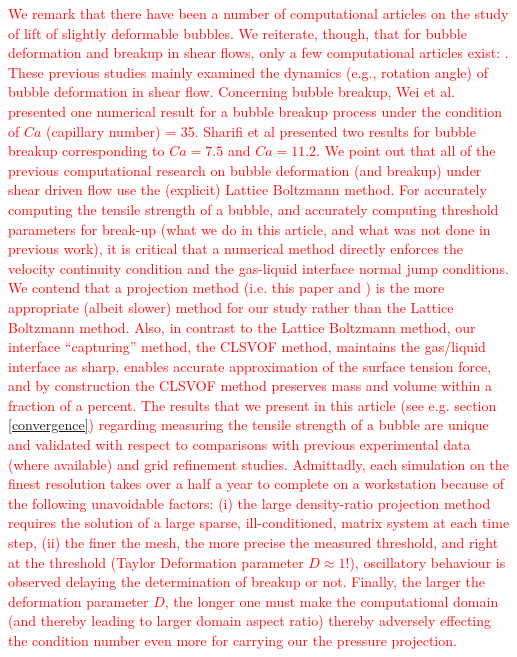 \documentclass{elsarticle}
\begin{document}
\textcolor{red} {
	We remark that there have been a number of computational articles on the study of lift of slightly deformable bubbles\cite{ErvinANDTryggvason1997,legendre1998lift}.  We reiterate, though, that for bubble deformation and breakup in shear flows, only a few computational articles exist: \cite{WeiQiaXu12,WanShiZha15,AAMM-16-2}.  These previous studies mainly examined the dynamics (e.g., rotation angle) of bubble deformation in shear flow.  Concerning bubble breakup, Wei et al.~\cite{WeiQiaXu12} presented one numerical result for a bubble breakup process under the condition of $Ca$ (capillary number) = 35. Sharifi et al\cite{AAMM-16-2} presented two results for bubble breakup corresponding to $Ca=7.5$ and $Ca=11.2$.  We point out that all of the previous computational research on bubble deformation (and breakup) under shear driven flow\cite{WeiQiaXu12,WanShiZha15,AAMM-16-2} use the (explicit) Lattice Boltzmann method.  For accurately computing the tensile strength of a bubble, and accurately computing threshold parameters for break-up (what we do in this article, and what was not done in previous work), it is critical that a numerical method directly enforces the velocity continuity condition and the gas-liquid interface normal jump conditions.  We contend that a projection method (i.e. this paper and \cite{zhang2021three,zhang2022three,OhtSus12}) is the more appropriate (albeit slower) method for our study rather than the Lattice Boltzmann method.  Also, in contrast to the Lattice Boltzmann method, our interface ``capturing'' method, the CLSVOF method\cite{SusPuc00,SusSmiHusOhtZhi07}, maintains the gas/liquid interface as sharp, enables accurate approximation of the surface tension force,  and by construction the CLSVOF method preserves mass and volume within a fraction of a percent. The results that we present in this article (see e.g. section \ref{convergence}) regarding measuring the tensile strength of a bubble are unique and validated with respect to comparisons with previous experimental data (where available) and grid refinement studies.  Admittadly, each simulation on the finest resolution takes over a half a year to complete on a workstation because of the following unavoidable factors: (i) the large density-ratio projection method requires the solution of a large sparse, ill-conditioned, matrix system at each time step, (ii) the finer the mesh, the more precise the measured threshold, and right at the threshold (Taylor Deformation parameter $D\approx 1$!), oscillatory behaviour is observed delaying the determination of breakup or not.  Finally, the larger the deformation parameter $D$, the longer one must make the computational domain (and thereby leading to larger domain aspect ratio) thereby adversely effecting the condition number even more for carrying our the pressure projection. 
}
\end{document}
